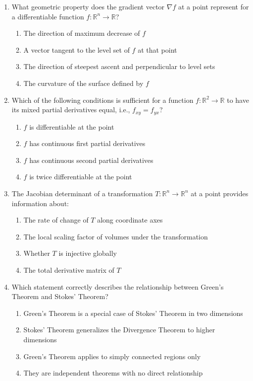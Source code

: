 \documentclass[11pt]{article}
\begin{document}
\begin{enumerate}[label=\textbf{\arabic*.}]

  \item What geometric property does the gradient vector $\nabla f$ at a point represent for a 
  differentiable function $f: \mathbb{R}^n \to \mathbb{R}$?
  \begin{enumerate}[label=(\Alph*)]
    \item The direction of maximum decrease of $f$
    \item A vector tangent to the level set of $f$ at that point
    \item The direction of steepest ascent and perpendicular to level sets
    \item The curvature of the surface defined by $f$
  \end{enumerate}

  \item Which of the following conditions is sufficient for a function $f: \mathbb{R}^2 \to \mathbb{R}$ 
  to have its mixed partial derivatives equal, i.e., $f_{xy} = f_{yx}$?
  \begin{enumerate}[label=(\Alph*)]
    \item $f$ is differentiable at the point
    \item $f$ has continuous first partial derivatives
    \item $f$ has continuous second partial derivatives
    \item $f$ is twice differentiable at the point
  \end{enumerate}

  \item The Jacobian determinant of a transformation $T: \mathbb{R}^n \to \mathbb{R}^n$ at a point 
  provides information about:
  \begin{enumerate}[label=(\Alph*)]
    \item The rate of change of $T$ along coordinate axes
    \item The local scaling factor of volumes under the transformation
    \item Whether $T$ is injective globally
    \item The total derivative matrix of $T$
  \end{enumerate}

  \item Which statement correctly describes the relationship between Green's Theorem and Stokes' Theorem?
  \begin{enumerate}[label=(\Alph*)]
    \item Green's Theorem is a special case of Stokes' Theorem in two dimensions
    \item Stokes' Theorem generalizes the Divergence Theorem to higher dimensions
    \item Green's Theorem applies to simply connected regions only
    \item They are independent theorems with no direct relationship
  \end{enumerate}


\end{enumerate}
\end{document}
